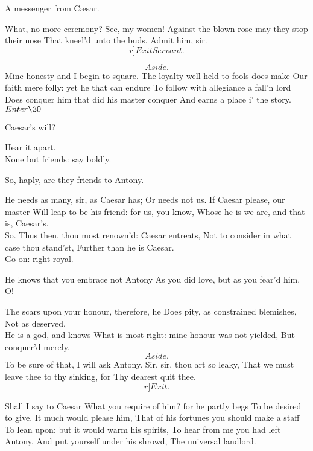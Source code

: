 \documentclass{book}
\begin{document}
	                  A messenger from C\ae{}sar.

\2	What, no more ceremony? See, my women!
	Against the blown rose may they stop their nose
	That kneel'd unto the buds. Admit him, sir. 	\[r]Exit Servant.\]

	\[Aside.\]  Mine honesty and I begin to square.
	The loyalty well held to fools does make
	Our faith mere folly: yet he that can endure
	To follow with allegiance a fall'n lord
	Does conquer him that did his master conquer
	And earns a place i' the story.\\

	\(Enter \30\)

\2	Caesar's will?

	Hear it apart. \\

\2	                  None but friends: say boldly.

	So, haply, are they friends to Antony.

	He needs as many, sir, as Caesar has;
	Or needs not us. If Caesar please, our master
	Will leap to be his friend: for us, you know,
	Whose he is we are, and that is, Caesar's. \\

	So.
	Thus then, thou most renown'd: Caesar entreats,
	Not to consider in what case thou stand'st,
	Further than he is Caesar. \\

\2	Go on: right royal.

	He knows that you embrace not Antony
	As you did love, but as you fear'd him. \\

\2	O!

	The scars upon your honour, therefore, he
	Does pity, as constrained blemishes,
	Not as deserved. \\

\2	                  He is a god, and knows
	What is most right: mine honour was not yielded,
	But conquer'd merely. \\

	\[Aside.\]             To be sure of that,
	I will ask Antony. Sir, sir, thou art so leaky,
	That we must leave thee to thy sinking, for
	Thy dearest quit thee. \\	\[r]Exit.\]

	Shall I say to Caesar
	What you require of him? for he partly begs
	To be desired to give. It much would please him,
	That of his fortunes you should make a staff
	To lean upon: but it would warm his spirits,
	To hear from me you had left Antony,
	And put yourself under his shrowd,
	The universal landlord. \\
\end{document}
